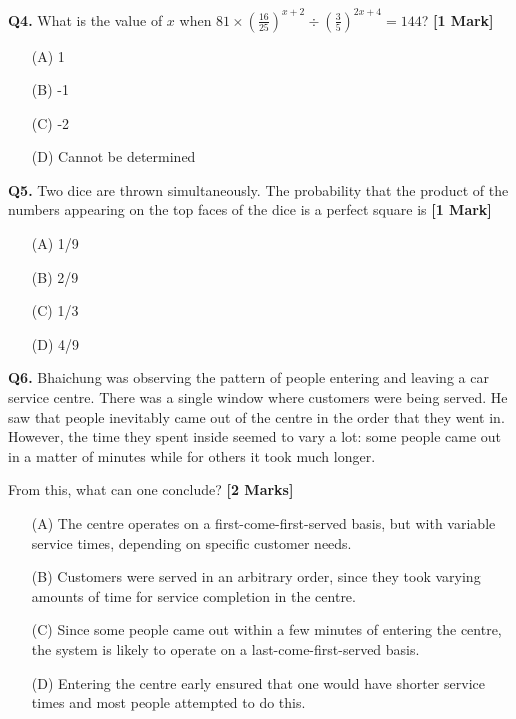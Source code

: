 \documentclass[11pt]{article}
\newcommand{\questiona}[2]{
    \noindent\textbf{Q#2.} #1 \hfill \textbf{[1 Mark]}
}
\newcommand{\questionb}[2]{
    \noindent\textbf{Q#2.} #1 \hfill \textbf{[2 Marks]}
}
\begin{document}
\vspace{0.5cm}

\questiona{What is the value of \( x \) when \( 81 \times \left( \frac{16}{25} \right)^{x+2} \div \left( \frac{3}{5} \right)^{2x+4} = 144 \)?}{4}
\begin{enumerate}
    \item[(A)] 1  
    \item[(B)] -1  
    \item[(C)] -2  
    \item[(D)] Cannot be determined  
\end{enumerate}

\vspace{0.5cm}

\questiona{Two dice are thrown simultaneously. The probability that the product of the numbers appearing on the top faces of the dice is a perfect square is}{5}
\begin{enumerate}
    \item[(A)] 1/9  
    \item[(B)] 2/9  
    \item[(C)] 1/3  
    \item[(D)] 4/9  
\end{enumerate}

\vspace{0.5cm}

\questionb{Bhaichung was observing the pattern of people entering and leaving a car service centre. There was a single window where customers were being served. He saw that people inevitably came out of the centre in the order that they went in. However, the time they spent inside seemed to vary a lot: some people came out in a matter of minutes while for others it took much longer.

From this, what can one conclude?}{6}
\begin{enumerate}
    \item[(A)] The centre operates on a first-come-first-served basis, but with variable service times, depending on specific customer needs.
    \item[(B)] Customers were served in an arbitrary order, since they took varying amounts of time for service completion in the centre.
    \item[(C)] Since some people came out within a few minutes of entering the centre, the system is likely to operate on a last-come-first-served basis.
    \item[(D)] Entering the centre early ensured that one would have shorter service times and most people attempted to do this.
\end{enumerate}
\end{document}
